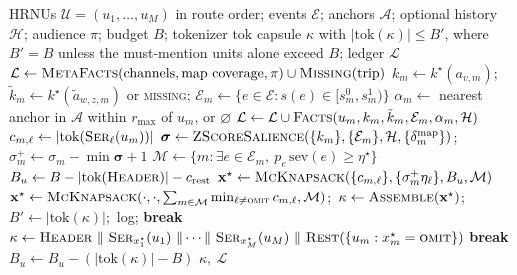 \begin{algorithm*}[t]
\caption{Kinetic--Spatial Tokenizer (KST)}
\label{alg:kst}
\begin{algorithmic}[1]
\Require HRNUs $\mathcal U=(u_1,\dots,u_M)$ in route order; events $\mathcal E$; anchors $\mathcal A$; optional history $\mathcal H$; audience $\pi$; budget $B$; tokenizer $\mathrm{tok}$
\Ensure capsule $\kappa$ with $|\mathrm{tok}(\kappa)|\le B'$, where $B'=B$ unless the must-mention units alone exceed $B$; ledger $\mathcal L$
\State $\mathcal L\gets\textsc{MetaFacts}(\text{channels},\text{map coverage},\pi)\cup\textsc{Missing}(\text{trip})$
  \State $k_m\gets k^\star(a_{v,m})$;\quad $\tilde k_m\gets k^\star(\tilde a_{w,z,m})$ or \textsc{missing}; \quad $\mathcal E_m\gets\{e\in\mathcal E: s(e)\in[s^0_m,s^1_m)\}$
  \State $\alpha_m\gets$ nearest anchor in $\mathcal A$ within $r_{\max}$ of $u_m$, or $\varnothing$
  \State $\mathcal L\gets\mathcal L\cup\textsc{Facts}(u_m,k_m,\tilde k_m,\mathcal E_m,\alpha_m,\mathcal H)$ 
    \State $c_{m,\ell}\gets|\mathrm{tok}(\textsc{Ser}_\ell(u_m))|$
  \EndFor
\EndFor
\State $\boldsymbol\sigma\gets\textsc{ZScoreSalience}(\{k_m\},\{\mathcal E_m\},\mathcal H,\{\delta^{\mathrm{map}}_m\})$;\quad $\sigma^+_m\gets\sigma_m-\min\boldsymbol\sigma+1$
\State $\mathcal M\gets\{m:\exists e\in\mathcal E_m,\ p_e\,\mathrm{sev}(e)\ge\eta^\star\}$ 
\State $B_u\gets B-|\mathrm{tok}(\textsc{Header})|-c_{\mathrm{rest}}$
\Loop
  \State $\mathbf x^\star\gets\textsc{McKnapsack}(\{c_{m,\ell}\},\{\sigma^+_m\eta_\ell\},B_u,\mathcal M)$ 
    \State $\mathbf x^\star\gets\textsc{McKnapsack}(\cdot,\cdot,\sum_{m\in\mathcal M}\min_{\ell\ne\textsc{omit}}c_{m,\ell},\mathcal M)$;\ $\kappa\gets\textsc{Assemble}(\mathbf x^\star)$;\ $B'\gets|\mathrm{tok}(\kappa)|$;\ log; \textbf{break}
  \EndIf
  \State $\kappa\gets\textsc{Header}\ \|\ \textsc{Ser}_{x^\star_1}(u_1)\ \|\cdots\|\ \textsc{Ser}_{x^\star_M}(u_M)\ \|\ \textsc{Rest}(\{u_m:x^\star_m=\textsc{omit}\})$
   \textbf{break} \EndIf
  \State $B_u\gets B_u-(|\mathrm{tok}(\kappa)|-B)$ 
\EndLoop
\State \Return $\kappa,\ \mathcal L$
\end{algorithmic}
\end{algorithm*}

